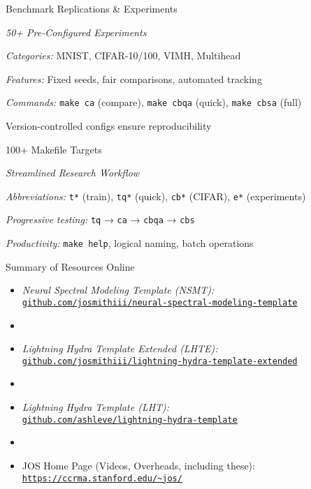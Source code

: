 \begin{slide}[\slideopts,toc={Benchmarks}]{Benchmark Replications \& Experiments}
  
  \emph{50+ Pre-Configured Experiments}
  
  \begin{itemize}
    \mpitem \emph{Categories:} MNIST, CIFAR-10/100, VIMH, Multihead
    
    \mpitem \emph{Features:} Fixed seeds, fair comparisons, automated tracking
    
    \mpitem \emph{Commands:} \texttt{make ca} (compare), \texttt{make cbqa} (quick), \texttt{make cbsa} (full)
    
    \mpitem Version-controlled configs ensure reproducibility
  \end{itemize}
\end{slide}

\begin{slide}[\slideopts,toc={Makefile}]{100+ Makefile Targets}
  
  \emph{Streamlined Research Workflow}
  
  \begin{itemize}
    \mpitem \emph{Abbreviations:} \texttt{t*} (train), \texttt{tq*} (quick), \texttt{cb*} (CIFAR), \texttt{e*} (experiments)
    
    \mpitem \emph{Progressive testing:} \texttt{tq} → \texttt{ca} → \texttt{cbqa} → \texttt{cbs}
    
    \mpitem \emph{Productivity:} \texttt{make help}, logical naming, batch operations
  \end{itemize}
\end{slide}

\begin{slide}[\slideopts,toc={}]{Summary of Resources Online}
  \begin{itemize}
    \item \emph{Neural Spectral Modeling Template (NSMT):}\\
      \href{https://github.com/josmithiii/neural-spectral-modeling-template.git}
           {\texttt{github.com/josmithiii/neural-spectral-modeling-template}}
    \item[]
    \item \emph{Lightning Hydra Template Extended (LHTE):}\\
      \href{https://github.com/josmithiii/lightning-hydra-template-extended.git}
           {\texttt{github.com/josmithiii/lightning-hydra-template-extended}}
    \item[]
    \item \emph{Lightning Hydra Template (LHT):}\\
      \href{https://github.com/ashleve/lightning-hydra-template}
           {\texttt{github.com/ashleve/lightning-hydra-template}}
    \item[]
    \item JOS Home Page (Videos, Overheads, including these):\\
      \href{https://ccrma.stanford.edu/~jos/Welcome.html}
           {\texttt{https://ccrma.stanford.edu/\~{}jos/}}
  \end{itemize}
\end{slide}
